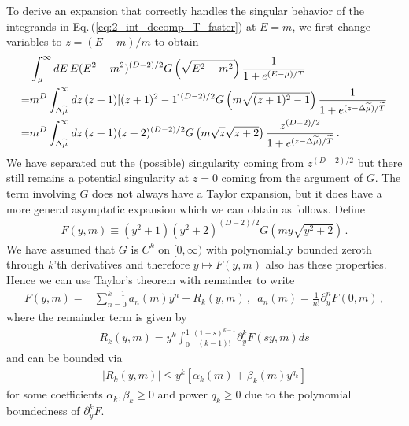 \documentclass[sn-mathphys,Numbered]{sn-jnl}
\newcommand{\req}[1]{Eq.\,(\ref{#1})}
\begin{document}
To derive an expansion that correctly handles the singular behavior of the integrands in \req{eq:2_int_decomp_T_faster} at $E=m$, we first change variables to $z=(E-m)/m$ to obtain
\begin{align}
&\int_{\mu}^\infty dE\, E(E^2-m^2)^{(D-2)/2} G\left(\sqrt{E^2-m^2}\right)
 \frac{1}{1+e^{(E-\mu)/T}}\notag \\
 =&m^{D}\int_{\Delta\widetilde{\mu}}^\infty dz\, (z+1)[(z+1)^2-1]^{(D-2)/2} G\left(m\sqrt{(z+1)^2-1}\right)
 \frac{1}{1+e^{(z-\Delta\widetilde{\mu})/\widetilde{T}}} \notag\\
 =&m^{D}\int_{\Delta\widetilde{\mu}}^\infty dz\, (z+1)( z+2)^{(D-2)/2} G\left(m\sqrt{z}\sqrt{z+2}\right)
 \frac{z^{(D-2)/2}}{1+e^{(z-\Delta\widetilde{\mu})/\widetilde{T}}} \,.\label{eq:T_faster_int_1_change_vars}
\end{align}
We have separated out the (possible) singularity coming from $z^{(D-2)/2}$ but there still remains a potential singularity at $z=0$ coming from the argument of $G$. The term involving $G$ does not always have a Taylor expansion, but it does have a more general asymptotic expansion which we can obtain as follows. Define 
\begin{align}\label{eq:F_y_m_def}
 F(y,m)\equiv (y^2+1)( y^2+2)^{(D-2)/2} G\left(my\sqrt{y^2+2}\right)\,.
\end{align}
We have assumed that $G$ is $C^k$ on $[0,\infty)$ with polynomially bounded zeroth through $k$'th derivatives and therefore $y\mapsto F(y,m)$ also has these properties. Hence we can use Taylor's theorem with remainder to write
\begin{align}\label{eq:F_y_m_Taylor}
F(y,m)=&\sum_{n=0}^{k-1} a_n(m)y^n +R_k(y,m)\,, \,\,\,a_n(m)=\frac{1}{n!}\partial_y^n F(0,m)\,,
\end{align}
where the remainder term is given by
\begin{align}
R_k(y,m)=y^k \int_0^1\frac{(1-s)^{k-1}}{(k-1)!}\partial_y^k F(sy,m)ds
\end{align}
and can be bounded via
\begin{align}\label{eq:R_k_poly_bound}
|R_k(y,m)|\leq y^k[\alpha_k(m)+\beta_k(m)y^{q_k}]
\end{align}
for some coefficients $\alpha_k,\beta_k\geq 0$ and power $q_k\geq 0$ due to the polynomial boundedness of $\partial_y^k F$.
\end{document}
